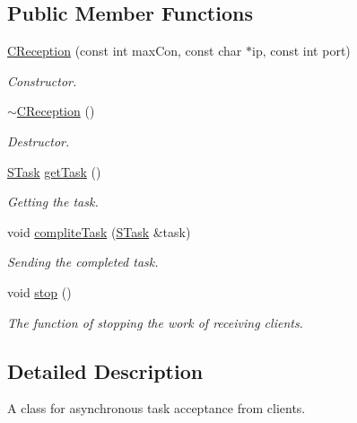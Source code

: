 \subsection*{Public Member Functions}
\begin{DoxyCompactItemize}
\item 
\mbox{\hyperlink{class_c_reception_a978822b58f7e3ec745869c9649c6dd14}{C\+Reception}} (const int max\+Con, const char $\ast$ip, const int port)
\begin{DoxyCompactList}\small\item\em Constructor. \end{DoxyCompactList}\item 
\mbox{\label{class_c_reception_a6332fe59732e3eb5c2c6f5efecaaa2c5}} 
\mbox{\hyperlink{class_c_reception_a6332fe59732e3eb5c2c6f5efecaaa2c5}{$\sim$\+C\+Reception}} ()
\begin{DoxyCompactList}\small\item\em Destructor. \end{DoxyCompactList}\item 
\mbox{\hyperlink{struct_s_task}{S\+Task}} \mbox{\hyperlink{class_c_reception_a842ffb5e64b4e65ff9faa087ffcd31fe}{get\+Task}} ()
\begin{DoxyCompactList}\small\item\em Getting the task. \end{DoxyCompactList}\item 
void \mbox{\hyperlink{class_c_reception_a286512c534ff02e51e8217241dd89727}{complite\+Task}} (\mbox{\hyperlink{struct_s_task}{S\+Task}} \&task)
\begin{DoxyCompactList}\small\item\em Sending the completed task. \end{DoxyCompactList}\item 
\mbox{\label{class_c_reception_ae29e31358d6a1e7f410f3f07d93793ba}} 
void \mbox{\hyperlink{class_c_reception_ae29e31358d6a1e7f410f3f07d93793ba}{stop}} ()
\begin{DoxyCompactList}\small\item\em The function of stopping the work of receiving clients. \end{DoxyCompactList}\end{DoxyCompactItemize}


\subsection{Detailed Description}
A class for asynchronous task acceptance from clients. 

